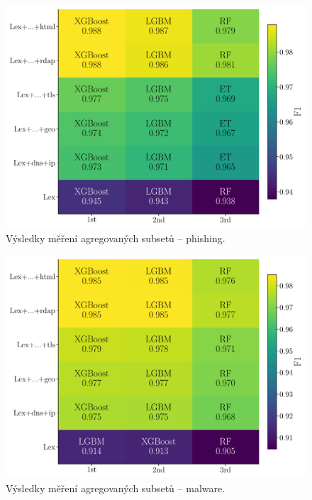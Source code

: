 \clearpage                  %
\begin{figure}[!h]
    \centering
    \includegraphics[width=\columnwidth]{obrazky-figures/agg_phishing.pdf}
    \caption{Výsledky měření agregovaných subsetů – phishing.}
    \label{fig:aggregate_phish_results}
\end{figure}
 
\begin{figure}[!h]
    \centering
    \includegraphics[width=\columnwidth]{obrazky-figures/agg_malware.pdf}
    \caption{Výsledky měření agregovaných subsetů – malware.}
    \label{fig:aggregate_malware_results}
\end{figure}



